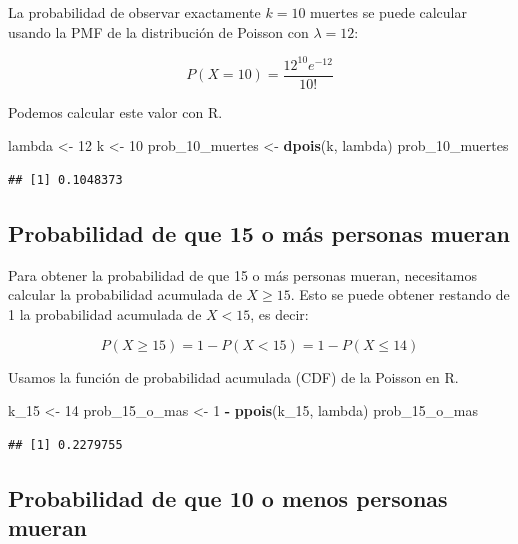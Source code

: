 \documentclass[
]{article}
\newenvironment{Shaded}{\begin{snugshade}}{\end{snugshade}}
\newcommand{\DecValTok}[1]{\textcolor[rgb]{0.00,0.00,0.81}{#1}}
\newcommand{\FunctionTok}[1]{\textcolor[rgb]{0.13,0.29,0.53}{\textbf{#1}}}
\newcommand{\NormalTok}[1]{#1}
\newcommand{\OtherTok}[1]{\textcolor[rgb]{0.56,0.35,0.01}{#1}}
\newcommand{\SpecialCharTok}[1]{\textcolor[rgb]{0.81,0.36,0.00}{\textbf{#1}}}
\begin{document}
La probabilidad de observar exactamente \(k = 10\) muertes se puede calcular usando la PMF de la distribución de Poisson con \(\lambda = 12\):

\[ P(X = 10) = \frac{12^{10} e^{-12}}{10!} \]

Podemos calcular este valor con R.

\begin{Shaded}
\begin{Highlighting}[]
\NormalTok{lambda }\OtherTok{\textless{}{-}} \DecValTok{12}
\NormalTok{k }\OtherTok{\textless{}{-}} \DecValTok{10}
\NormalTok{prob\_10\_muertes }\OtherTok{\textless{}{-}} \FunctionTok{dpois}\NormalTok{(k, lambda)}
\NormalTok{prob\_10\_muertes}
\end{Highlighting}
\end{Shaded}

\begin{verbatim}
## [1] 0.1048373
\end{verbatim}

\subsection{Probabilidad de que 15 o más personas mueran}\label{probabilidad-de-que-15-o-muxe1s-personas-mueran}

Para obtener la probabilidad de que 15 o más personas mueran, necesitamos calcular la probabilidad acumulada de \(X \geq 15\). Esto se puede obtener restando de 1 la probabilidad acumulada de \(X < 15\), es decir:

\[ P(X \geq 15) = 1 - P(X < 15) = 1 - P(X \leq 14) \]

Usamos la función de probabilidad acumulada (CDF) de la Poisson en R.

\begin{Shaded}
\begin{Highlighting}[]
\NormalTok{k\_15 }\OtherTok{\textless{}{-}} \DecValTok{14}
\NormalTok{prob\_15\_o\_mas }\OtherTok{\textless{}{-}} \DecValTok{1} \SpecialCharTok{{-}} \FunctionTok{ppois}\NormalTok{(k\_15, lambda)}
\NormalTok{prob\_15\_o\_mas}
\end{Highlighting}
\end{Shaded}

\begin{verbatim}
## [1] 0.2279755
\end{verbatim}

\subsection{Probabilidad de que 10 o menos personas mueran}\label{probabilidad-de-que-10-o-menos-personas-mueran}
\end{document}
